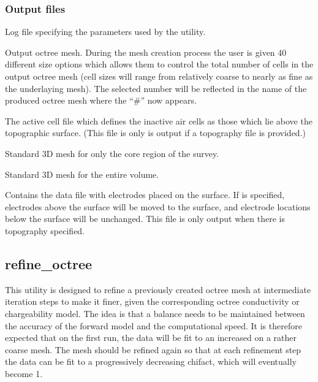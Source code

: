 \subsubsection{Output files}
\begin{description}[leftmargin=5cm, style=sameline, align=left]
\item[\fileName{octree\_mesh.log}] Log file specifying the parameters used by the  utility.
\item[\fileName{octree\_mesh\_\#.txt}] Output octree mesh. During the mesh creation process the user is given 40 different size options which allows them to control the total number of cells in the output octree mesh (cell sizes will range from relatively coarse to nearly as fine as the underlaying mesh). The selected number will be reflected in the name of the produced octree mesh where the ``\#'' now appears.
\item[\fileName{active\_cells.txt}] The active cell file which defines the inactive air cells as those which lie above the topographic surface. (This file is only is output if a topography file is provided.)
\item[\fileName{3D\_mesh\_core.txt}] Standard 3D mesh for only the core region of the survey.
\item[\fileName{3D\_mesh.txt}] Standard 3D mesh for the entire volume.
\item[\fileName{data\_z.txt}] Contains the data file with electrodes placed on the surface. If  is specified, electrodes above the surface will be moved to the surface, and electrode locations below the surface will be unchanged. This file is only output when there is topography specified.
\end{description}


\subsection{refine\_octree}

This utility is designed to refine a previously created octree mesh at intermediate iteration steps to make it finer, given the corresponding octree conductivity or chargeability model. The idea is that a balance needs to be  maintained between the accuracy of the forward model and the computational speed. It is therefore expected that on the first run, the data will be fit to an increased  on a rather coarse mesh. The mesh should be refined again so that at each refinement step the data can be fit to a progressively decreasing chifact, which will eventually become 1.

